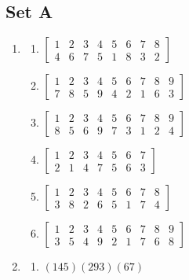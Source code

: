 \documentclass{article}
\begin{document}
\subsection{Set A}
\begin{enumerate}
    \item
        \begin{enumerate}[label=(\alph*)]
            \item $\begin{bmatrix}
                1 & 2 & 3 & 4 & 5 & 6 & 7 & 8 \\
                4 & 6 & 7 & 5 & 1 & 8 & 3 & 2
            \end{bmatrix}$

            \item $\begin{bmatrix}
                1 & 2 & 3 & 4 & 5 & 6 & 7 & 8 & 9 \\
                7 & 8 & 5 & 9 & 4 & 2 & 1 & 6 & 3
            \end{bmatrix}$

            \item $\begin{bmatrix}
                1 & 2 & 3 & 4 & 5 & 6 & 7 & 8 & 9 \\
                8 & 5 & 6 & 9 & 7 & 3 & 1 & 2 & 4
            \end{bmatrix}$

            \item $\begin{bmatrix}
                1 & 2 & 3 & 4 & 5 & 6 & 7 \\
                2 & 1 & 4 & 7 & 5 & 6 & 3
            \end{bmatrix}$

            \item $\begin{bmatrix}
                1 & 2 & 3 & 4 & 5 & 6 & 7 & 8 \\
                3 & 8 & 2 & 6 & 5 & 1 & 7 & 4 
            \end{bmatrix}$

            \item $\begin{bmatrix}
                1 & 2 & 3 & 4 & 5 & 6 & 7 & 8 & 9 \\
                3 & 5 & 4 & 9 & 2 & 1 & 7 & 6 & 8
            \end{bmatrix}$
        \end{enumerate}

        \item
            \begin{enumerate}[label=(\alph*)]
                \item $(145)(293)(67)$


\end{enumerate}
\end{enumerate}
\end{document}
